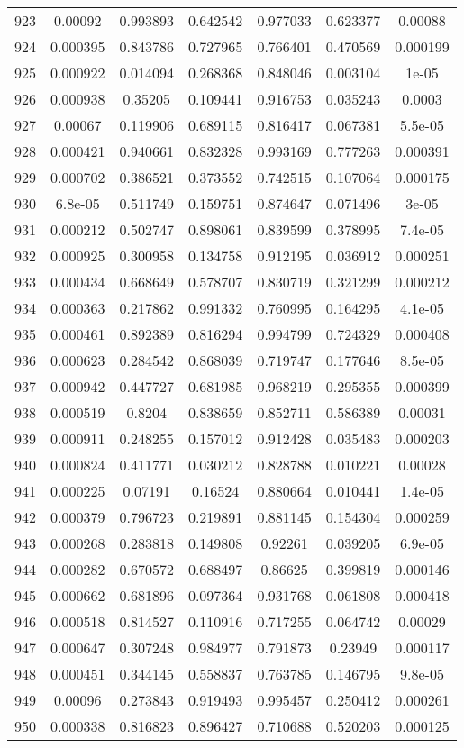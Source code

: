 \begin{table}
\begin{tabular}{c|c|c|c|c|c|c}
923 & 0.00092 & 0.993893 & 0.642542 & 0.977033 & 0.623377 & 0.00088\\
924 & 0.000395 & 0.843786 & 0.727965 & 0.766401 & 0.470569 & 0.000199\\
925 & 0.000922 & 0.014094 & 0.268368 & 0.848046 & 0.003104 & 1e-05\\
926 & 0.000938 & 0.35205 & 0.109441 & 0.916753 & 0.035243 & 0.0003\\
927 & 0.00067 & 0.119906 & 0.689115 & 0.816417 & 0.067381 & 5.5e-05\\
928 & 0.000421 & 0.940661 & 0.832328 & 0.993169 & 0.777263 & 0.000391\\
929 & 0.000702 & 0.386521 & 0.373552 & 0.742515 & 0.107064 & 0.000175\\
930 & 6.8e-05 & 0.511749 & 0.159751 & 0.874647 & 0.071496 & 3e-05\\
931 & 0.000212 & 0.502747 & 0.898061 & 0.839599 & 0.378995 & 7.4e-05\\
932 & 0.000925 & 0.300958 & 0.134758 & 0.912195 & 0.036912 & 0.000251\\
933 & 0.000434 & 0.668649 & 0.578707 & 0.830719 & 0.321299 & 0.000212\\
934 & 0.000363 & 0.217862 & 0.991332 & 0.760995 & 0.164295 & 4.1e-05\\
935 & 0.000461 & 0.892389 & 0.816294 & 0.994799 & 0.724329 & 0.000408\\
936 & 0.000623 & 0.284542 & 0.868039 & 0.719747 & 0.177646 & 8.5e-05\\
937 & 0.000942 & 0.447727 & 0.681985 & 0.968219 & 0.295355 & 0.000399\\
938 & 0.000519 & 0.8204 & 0.838659 & 0.852711 & 0.586389 & 0.00031\\
939 & 0.000911 & 0.248255 & 0.157012 & 0.912428 & 0.035483 & 0.000203\\
940 & 0.000824 & 0.411771 & 0.030212 & 0.828788 & 0.010221 & 0.00028\\
941 & 0.000225 & 0.07191 & 0.16524 & 0.880664 & 0.010441 & 1.4e-05\\
942 & 0.000379 & 0.796723 & 0.219891 & 0.881145 & 0.154304 & 0.000259\\
943 & 0.000268 & 0.283818 & 0.149808 & 0.92261 & 0.039205 & 6.9e-05\\
944 & 0.000282 & 0.670572 & 0.688497 & 0.86625 & 0.399819 & 0.000146\\
945 & 0.000662 & 0.681896 & 0.097364 & 0.931768 & 0.061808 & 0.000418\\
946 & 0.000518 & 0.814527 & 0.110916 & 0.717255 & 0.064742 & 0.00029\\
947 & 0.000647 & 0.307248 & 0.984977 & 0.791873 & 0.23949 & 0.000117\\
948 & 0.000451 & 0.344145 & 0.558837 & 0.763785 & 0.146795 & 9.8e-05\\
949 & 0.00096 & 0.273843 & 0.919493 & 0.995457 & 0.250412 & 0.000261\\
950 & 0.000338 & 0.816823 & 0.896427 & 0.710688 & 0.520203 & 0.000125\\
\end{tabular}
\end{table}
